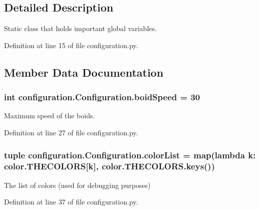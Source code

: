 \subsection{Detailed Description}
Static class that holds important global variables. 

Definition at line 15 of file configuration.\-py.



\subsection{Member Data Documentation}
\hypertarget{classconfiguration_1_1Configuration_a5062047bc933b81cbbaa841e20cb2a67}{
\subsubsection[{boid\-Speed}]{\setlength{\rightskip}{0pt plus 5cm}int configuration.\-Configuration.\-boid\-Speed = 30\hspace{0.3cm}{\ttfamily [static]}}}\label{classconfiguration_1_1Configuration_a5062047bc933b81cbbaa841e20cb2a67}


Maximum speed of the boids. 



Definition at line 27 of file configuration.\-py.

\hypertarget{classconfiguration_1_1Configuration_a2140643801852e373bfddf9945cf26f8}{
\subsubsection[{color\-List}]{\setlength{\rightskip}{0pt plus 5cm}tuple configuration.\-Configuration.\-color\-List = map(lambda k\-: color.\-T\-H\-E\-C\-O\-L\-O\-R\-S\mbox{[}k\mbox{]}, color.\-T\-H\-E\-C\-O\-L\-O\-R\-S.\-keys())\hspace{0.3cm}{\ttfamily [static]}}}\label{classconfiguration_1_1Configuration_a2140643801852e373bfddf9945cf26f8}


The list of colors (used for debugging purposes) 



Definition at line 37 of file configuration.\-py.


